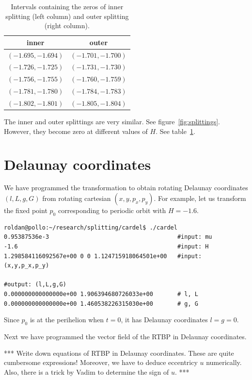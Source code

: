 \documentclass[a4paper]{amsart}
\theoremstyle{remark}
\begin{document}
\begin{table}
\begin{tabular}{|c|c|}
\hline
inner & outer \\
\hline
$ ( -1.695,-1.694 ) $ & $ ( -1.701,-1.700 ) $ \\
$ ( -1.726,-1.725 ) $ & $( -1.731,-1.730 ) $ \\
$ ( -1.756,-1.755 ) $ & $ ( -1.760,-1.759 ) $ \\
$ ( -1.781,-1.780 ) $ & $ ( -1.784,-1.783 ) $ \\
$ ( -1.802,-1.801 ) $ & $ ( -1.805,-1.804 ) $ \\
\hline
\end{tabular} 
\caption{Intervals containing the zeros of inner splitting (left
column) and outer splitting (right column).}
\label{tab:zeros_inner_outer}
\end{table}

The inner and outer splittings are very similar. See
figure~\ref{fig:splittings}.
However, they become zero at different values of $H$. See
table~\ref{tab:zeros_inner_outer}.

\section{Delaunay coordinates}

We have programmed the transformation to obtain rotating Delaunay
coordinates $(l,L,g,G)$ from rotating cartesian $(x,y,p_x,p_y)$.
For example, let us transform the fixed point $p_0$ corresponding to
periodic orbit with $H=-1.6$.

\begin{verbatim}
roldan@pollo:~/research/splitting/cardel$ ./cardel
0.95387536e-3                                     #input: mu
-1.6                                              #input: H
1.298584116092567e+00 0 0 1.124715918064501e+00   #input: (x,y,p_x,p_y)

#output: (l,L,g,G)
0.000000000000000e+00 1.906394680726033e+00       # l, L
0.000000000000000e+00 1.460538226315030e+00       # g, G
\end{verbatim}
Since $p_0$ is at the perihelion when $t=0$, it has Delaunay coordinates
$l=g=0$.

Next we have programmed the vector field of the RTBP in Delaunay
coordinates.

*** Write down equations of RTBP in Delaunay coordinates. 
These are quite cumbersome expressions! 
Moreover, we have to deduce eccentricy $u$ numerically. 
Also, there is a trick by Vadim to determine the sign of $u$. ***
\end{document}

